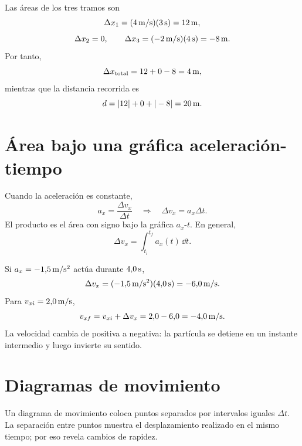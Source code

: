 \documentclass[11pt]{article}
\begin{document}
Las áreas de los tres tramos son
\[
  \Delta x_1
  =
  (4\,\mathrm{m/s})(3\,\mathrm{s})
  =
  12\,\mathrm{m},
\]
\[
  \Delta x_2=0,
  \qquad
  \Delta x_3
  =
  (-2\,\mathrm{m/s})(4\,\mathrm{s})
  =
  -8\,\mathrm{m}.
\]
Por tanto,
\[
  \Delta x_{\mathrm{total}}
  =
  12+0-8
  =
  4\,\mathrm{m},
\]
mientras que la distancia recorrida es
\[
  d=|12|+0+|-8|=20\,\mathrm{m}.
\]


\section{Área bajo una gráfica aceleración-tiempo}

Cuando la aceleración es constante,
\[
  a_x=\frac{\Delta v_x}{\Delta t}
  \quad\Longrightarrow\quad
  \Delta v_x=a_x\Delta t.
\]
El producto es el área con signo bajo la gráfica \(a_x\)-\(t\). En general,
\[
  \Delta v_x
  =
  \int_{t_i}^{t_f}a_x(t)\,\dd t.
\]

\begin{center}
\end{center}

Si \(a_x=-1{,}5\,\mathrm{m/s^2}\) actúa durante \(4{,}0\,\mathrm{s}\),
\[
  \Delta v_x
  =
  (-1{,}5\,\mathrm{m/s^2})(4{,}0\,\mathrm{s})
  =
  -6{,}0\,\mathrm{m/s}.
\]
Para \(v_{xi}=2{,}0\,\mathrm{m/s}\),
\[
  v_{xf}=v_{xi}+\Delta v_x
  =
  2{,}0-6{,}0
  =
  -4{,}0\,\mathrm{m/s}.
\]
La velocidad cambia de positiva a negativa: la partícula se detiene en un
instante intermedio y luego invierte su sentido.

\section{Diagramas de movimiento}

Un diagrama de movimiento coloca puntos separados por intervalos iguales
\(\Delta t\). La separación entre puntos muestra el desplazamiento realizado
en el mismo tiempo; por eso revela cambios de rapidez.
\end{document}

